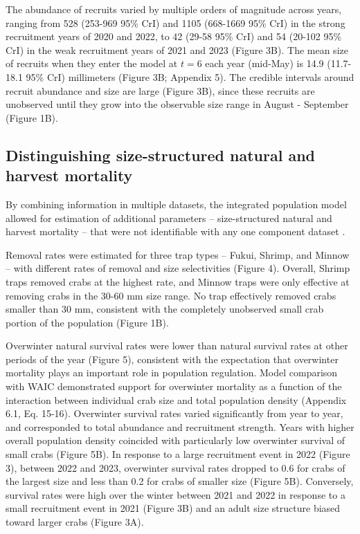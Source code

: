 \documentclass{article}
\begin{document}
The abundance of recruits varied by multiple orders of magnitude across years, ranging from 528 (253-969 95\% CrI) and 1105 (668-1669 95\% CrI) in the strong recruitment years of 2020 and 2022, to 42 (29-58 95\% CrI) and 54 (20-102 95\% CrI) in the weak recruitment years of 2021 and 2023 (Figure 3B). The mean size of recruits when they enter the model at $t = 6$ each year (mid-May) is 14.9 (11.7-18.1 95\% CrI) millimeters (Figure 3B; Appendix 5). The credible intervals around recruit abundance and size are large (Figure 3B), since these recruits are unobserved until they grow into the observable size range in August - September (Figure 1B).

\subsection{Distinguishing size-structured natural and harvest mortality}

By combining information in multiple datasets, the integrated population model allowed for estimation of additional parameters -- size-structured natural and harvest mortality -- that were not identifiable with any one component dataset \parencite{riecke2019integrated}.

Removal rates were estimated for three trap types -- Fukui, Shrimp, and Minnow -- with different rates of removal and size selectivities (Figure 4). Overall, Shrimp traps removed crabs at the highest rate, and Minnow traps were only effective at removing crabs in the 30-60 mm size range. No trap effectively removed crabs smaller than 30 mm, consistent with the completely unobserved small crab portion of the population (Figure 1B).

Overwinter natural survival rates were lower than natural survival rates at other periods of the year (Figure 5), consistent with the expectation that overwinter mortality plays an important role in population regulation. Model comparison with WAIC demonstrated support for overwinter mortality as a function of the interaction between individual crab size and total population density (Appendix 6.1, Eq. 15-16). Overwinter survival rates varied significantly from year to year, and corresponded to total abundance and recruitment strength. Years with higher overall population density coincided with particularly low overwinter survival of small crabs (Figure 5B). In response to a large recruitment event in 2022 (Figure 3), between 2022 and 2023, overwinter survival rates dropped to 0.6 for crabs of the largest size and less than 0.2 for crabs of smaller size (Figure 5B). Conversely, survival rates were high over the winter between 2021 and 2022 in response to a small recruitment event in 2021 (Figure 3B) and an adult size structure biased toward larger crabs (Figure 3A). 
\end{document}
